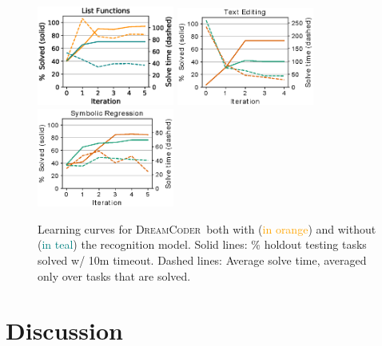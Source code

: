 \documentclass{article}
\newcommand{\system}{\textsc{DreamCoder}~}
\newcommand{\orange}[1]{\textcolor{orange}{#1}}
\newcommand{\teal}[1]{\textcolor{teal}{#1}}
\begin{document}
\begin{figure}\centering
  \includegraphics[width = 4.5cm]{figures/listLearningCurve.eps} \qquad
  \includegraphics[width = 4.5cm]{figures/textLearningCurve.eps}\qquad
  \includegraphics[width = 4.5cm]{figures/rationalCurve.eps}
\vspace{-0.4cm}  \caption{Learning curves for \system both with (\orange{in orange}) and without
    (\teal{in teal}) the recognition model. Solid lines: \% holdout testing tasks solved w/ 10m timeout. Dashed lines: Average solve time, averaged only over tasks that are solved.}\label{learningCurves}\vspace{-0.5cm}
\end{figure}

\section{Discussion}
\end{document}
